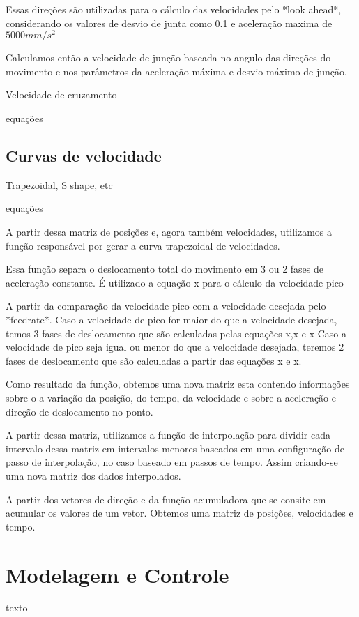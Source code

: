 Essas direções são utilizadas para o cálculo das velocidades pelo *look ahead*,
considerando os valores de desvio de junta como  0.1 e aceleração maxima de $5000 mm/s^2$

Calculamos então a velocidade de junção baseada no angulo das direções do movimento e
nos parâmetros da aceleração máxima e desvio máximo de junção.

Velocidade de cruzamento

equações

\subsection{Curvas de velocidade}
Trapezoidal, S shape, etc

equações


A partir dessa matriz de posições e, agora também velocidades,
utilizamos a função responsável por gerar a curva trapezoidal de velocidades.

Essa função separa o deslocamento total do movimento em 3 ou 2 fases de aceleração constante.
É utilizado a equação x para o cálculo da velocidade pico

A partir da comparação da velocidade pico com a velocidade desejada pelo *feedrate*.
Caso a velocidade de pico for maior do que a velocidade desejada, temos 3 fases de deslocamento
que são calculadas pelas equações x,x e x
Caso a velocidade de pico seja igual ou menor do que a velocidade desejada, teremos 2 fases de deslocamento
que são calculadas a partir das equações x e x.

Como resultado da função, obtemos uma nova matriz esta contendo informações
sobre o a variação da posição, do tempo, da velocidade e sobre a aceleração e direção de deslocamento no ponto.

A partir dessa matriz, utilizamos a função de interpolação para dividir cada intervalo dessa matriz em intervalos menores
baseados em uma configuração de passo de interpolação, no caso baseado em passos de tempo.
Assim criando-se uma nova matriz dos dados interpolados.

A partir dos vetores de direção e da função acumuladora que se consite em acumular os valores de um vetor.
Obtemos uma matriz de posições, velocidades e tempo.

\section{Modelagem e Controle}

texto


